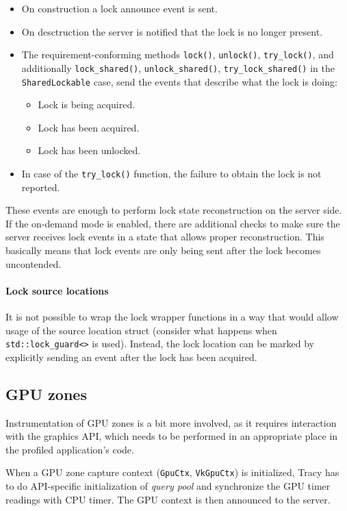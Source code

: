 \documentclass[hidelinks,titlepage,a4paper]{article}
\begin{document}
\begin{itemize}
\item On construction a lock announce event is sent.
\item On desctruction the server is notified that the lock is no longer present.
\item The requirement-conforming methods \texttt{lock()}, \texttt{unlock()}, \texttt{try\_lock()}, and additionally \texttt{lock\_shared()}, \texttt{unlock\_shared()}, \texttt{try\_lock\_shared()} in the \texttt{SharedLockable} case, send the events that describe what the lock is doing:
\begin{itemize}
\item Lock is being acquired.
\item Lock has been acquired.
\item Lock has been unlocked.
\end{itemize}
\item In case of the \texttt{try\_lock()} function, the failure to obtain the lock is not reported.
\end{itemize}

These events are enough to perform lock state reconstruction on the server side. If the on-demand mode is enabled, there are additional checks to make sure the server receives lock events in a state that allows proper reconstruction. This basically means that lock events are only being sent after the lock becomes uncontended.

\paragraph{Lock source locations}

It is not possible to wrap the lock wrapper functions in a way that would allow usage of the source location struct (consider what happens when \texttt{std::lock\_guard<>} is used). Instead, the lock location can be marked by explicitly sending an event after the lock has been acquired.

\subsection{GPU zones}

Instrumentation of GPU zones is a bit more involved, as it requires interaction with the graphics API, which needs to be performed in an appropriate place in the profiled application's code.

When a GPU zone capture context (\texttt{GpuCtx}, \texttt{VkGpuCtx}) is initialized, Tracy has to do API-specific initialization of \emph{query pool} and synchronize the GPU timer readings with CPU timer. The GPU context is then announced to the server.
\end{document}
